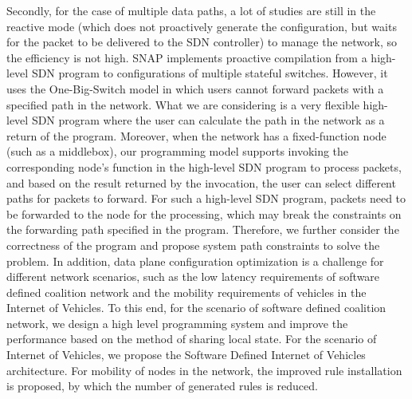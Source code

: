 \begin{eabstract}
Secondly, for the case of multiple data paths, a lot of studies are still in the reactive mode (which does not proactively generate the configuration, but waits for the packet to be delivered to the SDN controller) to manage the network, so the efficiency is not high. SNAP implements proactive compilation from a high-level SDN program to configurations of multiple stateful switches. However, it uses the One-Big-Switch model in which users cannot forward packets with a specified path in the network. What we are considering is a very flexible high-level SDN program where the user can calculate the path in the network as a return of the program. Moreover, when the network has a fixed-function node (such as a middlebox), our programming model supports invoking the corresponding node's function in the high-level SDN program to process packets, and based on the result returned by the invocation, the user can select different paths for packets to forward. For such a high-level SDN program, packets need to be forwarded to the node for the processing, which may break the constraints on the forwarding path specified in the program. Therefore, we further consider the correctness of the program and propose system path constraints to solve the problem. In addition, data plane configuration optimization is a challenge for different network scenarios, such as the low latency requirements of software defined coalition network and the mobility requirements of vehicles in the Internet of Vehicles. To this end, for the scenario of software defined coalition network, we design a high level programming system and improve the performance based on the method of sharing local state. For the scenario of Internet of Vehicles, we propose the Software Defined Internet of Vehicles architecture. For mobility of nodes in the network, the improved rule installation is proposed, by which the number of generated rules is reduced.

\end{eabstract}

